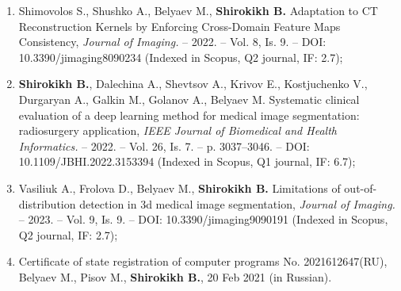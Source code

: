 \begin{enumerate}
    \item Shimovolos S., Shushko A., Belyaev M., \textbf{Shirokikh B.} Adaptation to CT Reconstruction Kernels by Enforcing Cross-Domain Feature Maps Consistency, \textit{Journal of Imaging.} -- 2022. -- Vol. 8, Is. 9. -- DOI: 10.3390/jimaging8090234 (Indexed in Scopus, Q2 journal, IF: 2.7);
    
    \item \textbf{Shirokikh B.}, Dalechina A., Shevtsov A., Krivov E., Kostjuchenko V., Durgaryan A., Galkin M., Golanov A., Belyaev M. Systematic clinical evaluation of a deep learning method for medical image segmentation: radiosurgery application, \textit{IEEE Journal of Biomedical and Health Informatics.} -- 2022. -- Vol. 26, Is. 7. -- p. 3037--3046. -- DOI: 10.1109/JBHI.2022.3153394 (Indexed in Scopus, Q1 journal, IF: 6.7);
    
    \item Vasiliuk A., Frolova D., Belyaev M., \textbf{Shirokikh B.} Limitations of out-of-distribution detection in 3d medical image segmentation, \textit{Journal of Imaging.} -- 2023. -- Vol. 9, Is. 9. -- DOI: 10.3390/jimaging9090191 (Indexed in Scopus, Q2 journal, IF: 2.7);
    
    \item Certificate of state registration of computer programs No. 2021612647(RU), Belyaev M., Pisov M., \textbf{Shirokikh B.}, 20 Feb 2021 (in Russian).
        
\end{enumerate}

    


\printbibliography[heading=subbibliography]
